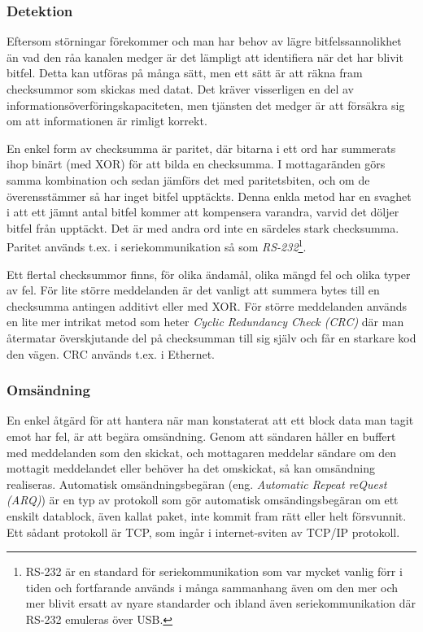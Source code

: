 \subsubsection{Detektion}

Eftersom störningar förekommer och man har behov av lägre bitfelssannolikhet
än vad den råa kanalen medger är det lämpligt att identifiera när det har
blivit bitfel. Detta kan utföras på många sätt, men ett sätt är att räkna fram
checksummor som skickas med datat. Det kräver visserligen en del av
informationsöverföringskapaciteten, men tjänsten det medger är att försäkra sig
om att informationen är rimligt korrekt.

En enkel form av checksumma är paritet, där bitarna i ett ord har summerats ihop
binärt (med XOR) för att bilda en checksumma. I mottagaränden görs samma
kombination och sedan jämförs det med paritetsbiten, och om de överensstämmer så
har inget bitfel upptäckts. Denna enkla metod har en svaghet i att ett jämnt
antal bitfel kommer att kompensera varandra, varvid det döljer bitfel från
upptäckt. Det är med andra ord inte en särdeles stark checksumma. Paritet
används t.ex. i seriekommunikation så som \emph{RS-232}\footnote{RS-232 är en standard för seriekommunikation som var mycket vanlig förr i tiden och fortfarande används i många sammanhang även om den mer och mer blivit ersatt av nyare standarder och ibland även seriekommunikation där RS-232 emuleras över USB.}. 


Ett flertal checksummor finns, för olika ändamål, olika mängd fel och olika
typer av fel. För lite större meddelanden är det vanligt att summera bytes
till en checksumma antingen additivt eller med XOR. För större meddelanden
används en lite mer intrikat metod som heter \emph{Cyclic Redundancy Check (CRC)}
där man återmatar överskjutande del på checksumman till sig själv och får en
starkare kod den vägen. CRC används t.ex. i Ethernet.

\subsubsection{Omsändning}

En enkel åtgärd för att hantera när man konstaterat att ett block data man
tagit emot har fel, är att begära omsändning. Genom att sändaren håller en
buffert med meddelanden som den skickat, och mottagaren meddelar sändare om
den mottagit meddelandet eller behöver ha det omskickat, så kan omsändning
realiseras. Automatisk omsändningsbegäran (eng. \emph{Automatic Repeat reQuest
(ARQ)}) är en typ av protokoll som gör automatisk omsändingsbegäran om ett
enskilt datablock, även kallat paket, inte kommit fram rätt eller helt
försvunnit. Ett sådant protokoll är TCP, som ingår i internet-sviten av TCP/IP
protokoll.

